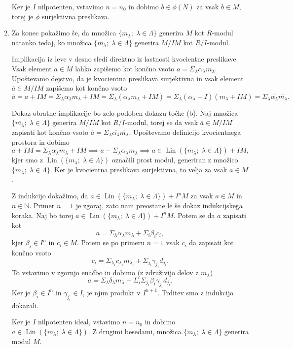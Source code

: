 \documentclass[a4paper, 12pt]{article} %
\DeclareMathOperator{\Lin}{Lin}
\newcommand{\N}{\mathbb{N}}
\begin{document}
\begin{enumerate}[label=(\alph*)]
	Ker je $I$ nilpotenten, vstavimo $n = n_0$ in dobimo $b \in \phi(N)$ za vsak $b \in M$, torej je $\phi$ surjektivna preslikava.
	
	\item Za konec pokažimo še, da množica $\lbrace m_\lambda ; \; \lambda \in \Lambda \rbrace$ generira $M$ kot $R$-modul natanko tedaj, ko množica $\lbrace \overline{m_\lambda} ; \; \lambda \in \Lambda \rbrace$ generira $M/IM$ kot $R/I$-modul.
	
	Implikacija iz leve v desno sledi direktno iz lastnosti kvocientne preslikave. Vsak element $a \in M$ lahko zapišemo kot končno vsoto $a = \Sigma_\lambda \alpha_\lambda m_\lambda$. Upoštevamo dejstvo, da je kvocientna preslikava surjektivna in vsak element $\overline{a} \in M/IM$ zapišemo kot končno vsoto
	\[
	\overline{a} = a + IM = \Sigma_\lambda \alpha_\lambda m_\lambda + IM = \Sigma_\lambda (\alpha_\lambda m_\lambda + IM) = \Sigma_\lambda (\alpha_\lambda + I) ( m_\lambda + IM) = \Sigma_\lambda \overline{\alpha_\lambda} \overline{m_\lambda}.
	\]
	
	Dokaz obratne implikacije bo zelo podoben dokazu točke (b). Naj množica $\lbrace \overline{m_\lambda} ; \; \lambda \in \Lambda \rbrace$ generira $M/IM$ kot $R/I$-modul, torej se da vsak $\overline{a} \in M/IM$ zapisati kot končno vsoto $\overline{a} = \Sigma_\lambda \overline{\alpha_\lambda} \overline{m_\lambda}$. Upoštevamo definicijo kvocientnega prostora in dobimo
	\[
	a + IM = \Sigma_\lambda \alpha_\lambda m_\lambda + IM \implies a - \Sigma_\lambda \alpha_\lambda m_\lambda \implies a \in \Lin(\lbrace m_\lambda ; \; \lambda \in \Lambda \rbrace) + IM,
	\]
	kjer smo z $\Lin(\lbrace m_\lambda ; \; \lambda \in \Lambda \rbrace)$ označili prost modul, generiran z množico  $\lbrace m_\lambda ; \; \lambda \in \Lambda \rbrace$. Ker je kvocientna preslikava surjektivna, to velja za vsak $a \in M$.
	
	Z indukcijo dokažimo, da $a \in \Lin(\lbrace m_\lambda ; \; \lambda \in \Lambda \rbrace) + I^nM$ za vsak $a \in M$ in $n \in \N$. Primer $n=1$ je zgoraj, zato nam preostane le še dokaz indukcijskega koraka. Naj bo torej $a \in \Lin(\lbrace m_\lambda ; \; \lambda \in \Lambda \rbrace) + I^nM$. Potem se da $a$ zapisati kot
	\[
	a =  \Sigma_\lambda \alpha_\lambda m_\lambda + \Sigma_i \beta_i c_i,
	\]
	kjer $\beta_i \in I^n$ in $c_i \in M$. Potem se po primeru $n = 1$ vsak $c_i$ da zapisati kot končno vsoto
	\[
	c_i = \Sigma_{\lambda_i} c_{\lambda_i} m_{\lambda_i} + \Sigma_{j_i} \gamma_{j_i} d_{j_i}.
	\]
	To vstavimo v zgornjo enačbo in dobimo (z združivijo delov z $m_\lambda$)
	\[
	a = \Sigma_\lambda \delta_\lambda m_\lambda + \Sigma_i\Sigma_{j_i}\beta_i \gamma_{j_i} d_{j_i}.
	\]
	Ker je $\beta_i \in I^n$ in $\gamma_{j_i} \in I$, je njun produkt v $I^{n+1}$. Trditev smo z indukcijo dokazali.
	
	Ker je $I$ nilpotenten ideal, vstavimo $n = n_0$ in dobimo $a \in \Lin(\lbrace m_\lambda ; \; \lambda \in \Lambda \rbrace)$. Z drugimi besedami, množica $\lbrace m_\lambda ; \; \lambda \in \Lambda \rbrace$ generira modul $M$.
\end{enumerate}
\end{document}
